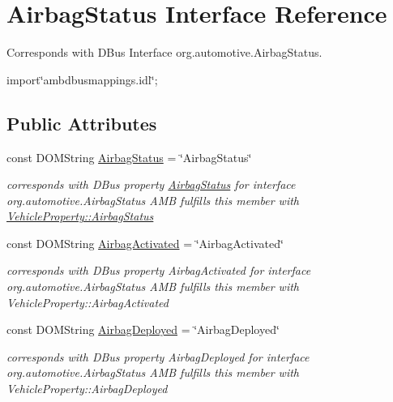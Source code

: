 \hypertarget{interfaceAirbagStatus}{\section{Airbag\+Status Interface Reference}
\label{interfaceAirbagStatus}
}


Corresponds with D\+Bus Interface org.\+automotive.\+Airbag\+Status.  




{\ttfamily import\char`\"{}ambdbusmappings.\+idl\char`\"{};}

\subsection*{Public Attributes}
\begin{DoxyCompactItemize}
\item 
\hypertarget{interfaceAirbagStatus_abb2e5adf5994835739f37101ad7388a0}{const D\+O\+M\+String \hyperlink{interfaceAirbagStatus_abb2e5adf5994835739f37101ad7388a0}{Airbag\+Status} = \char`\"{}Airbag\+Status\char`\"{}}\label{interfaceAirbagStatus_abb2e5adf5994835739f37101ad7388a0}

\begin{DoxyCompactList}\small\item\em corresponds with D\+Bus property \hyperlink{interfaceAirbagStatus}{Airbag\+Status} for interface org.\+automotive.\+Airbag\+Status A\+M\+B fulfills this member with \hyperlink{classVehicleProperty_a341a783cf4746bb7388ee460e62c309e}{Vehicle\+Property\+::\+Airbag\+Status} \end{DoxyCompactList}\item 
\hypertarget{interfaceAirbagStatus_a63769183e7384e723b358a56818e1b81}{const D\+O\+M\+String \hyperlink{interfaceAirbagStatus_a63769183e7384e723b358a56818e1b81}{Airbag\+Activated} = \char`\"{}Airbag\+Activated\char`\"{}}\label{interfaceAirbagStatus_a63769183e7384e723b358a56818e1b81}

\begin{DoxyCompactList}\small\item\em corresponds with D\+Bus property Airbag\+Activated for interface org.\+automotive.\+Airbag\+Status A\+M\+B fulfills this member with Vehicle\+Property\+::\+Airbag\+Activated \end{DoxyCompactList}\item 
\hypertarget{interfaceAirbagStatus_ae5fea197fb5de4ec5c23d5c252f0c5ce}{const D\+O\+M\+String \hyperlink{interfaceAirbagStatus_ae5fea197fb5de4ec5c23d5c252f0c5ce}{Airbag\+Deployed} = \char`\"{}Airbag\+Deployed\char`\"{}}\label{interfaceAirbagStatus_ae5fea197fb5de4ec5c23d5c252f0c5ce}

\begin{DoxyCompactList}\small\item\em corresponds with D\+Bus property Airbag\+Deployed for interface org.\+automotive.\+Airbag\+Status A\+M\+B fulfills this member with Vehicle\+Property\+::\+Airbag\+Deployed \end{DoxyCompactList}\end{DoxyCompactItemize}


